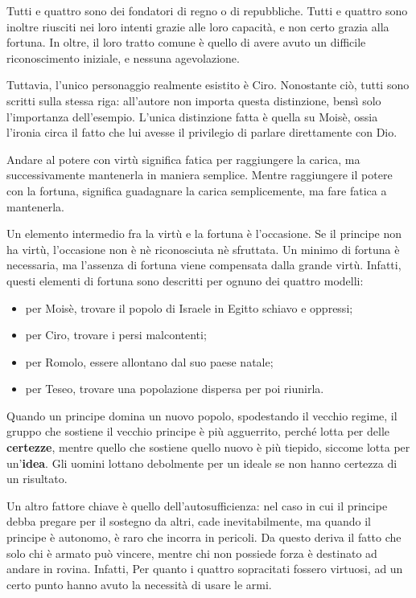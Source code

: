 \documentclass[a4paper]{article}
\begin{document}
Tutti e quattro sono dei fondatori di regno o di repubbliche.
Tutti e quattro sono inoltre riusciti nei loro intenti grazie
alle loro capacità, e non certo grazia alla fortuna.
In oltre, il loro tratto comune è quello di avere avuto un difficile riconoscimento iniziale,
e nessuna agevolazione.

Tuttavia, l'unico personaggio realmente esistito è Ciro.
Nonostante ciò, tutti sono scritti sulla stessa riga: all'autore non importa
questa distinzione, bensì solo l'importanza dell'esempio.
L'unica distinzione fatta è quella su Moisè, ossia l'ironia circa il fatto che lui
avesse il privilegio di parlare direttamente con Dio. 

Andare al potere con virtù significa fatica per raggiungere la carica,
ma successivamente mantenerla in maniera semplice.
Mentre raggiungere il potere con la fortuna, significa guadagnare la carica semplicemente,
ma fare fatica a mantenerla.

Un elemento intermedio fra la virtù e la fortuna è l'occasione.
Se il principe non ha virtù, l'occasione non è nè riconosciuta nè sfruttata.
Un minimo di fortuna è necessaria, ma l'assenza di fortuna viene compensata dalla grande virtù.
Infatti, questi elementi di fortuna sono descritti per ognuno dei quattro modelli:
\begin{itemize}
    \item per Moisè, trovare il popolo di Israele in Egitto schiavo e oppressi;
    \item per Ciro, trovare i persi malcontenti;
    \item per Romolo, essere allontano dal suo paese natale;
    \item per Teseo, trovare una popolazione dispersa per poi riunirla.
\end{itemize}

Quando un principe domina un nuovo popolo, spodestando il vecchio regime,
il gruppo che sostiene il vecchio principe è più agguerrito, perché lotta per delle \textbf{certezze},
mentre quello che sostiene quello nuovo è più tiepido, siccome lotta per un'\textbf{idea}.
Gli uomini lottano debolmente per un ideale se non hanno certezza di un risultato.

Un altro fattore chiave è quello dell'autosufficienza:
nel caso in cui il principe debba pregare per il sostegno da altri, cade inevitabilmente,
ma quando il principe è autonomo, è raro che incorra in pericoli.
Da questo deriva il fatto che solo chi è armato può vincere, mentre chi
non possiede forza è destinato ad andare in rovina.
Infatti, Per quanto i quattro sopracitati fossero virtuosi, ad un certo punto hanno avuto la necessità
di usare le armi.
\end{document}
